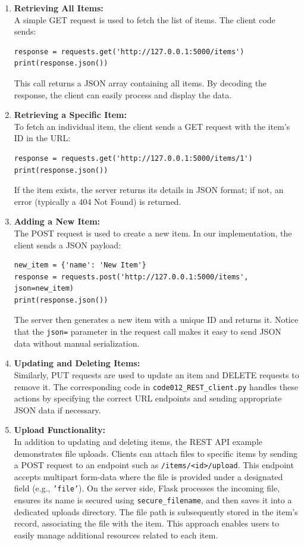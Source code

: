 \begin{enumerate}
  \item \textbf{Retrieving All Items:}\\  
  A simple GET request is used to fetch the list of items. The client code sends:
  \begin{verbatim}
response = requests.get('http://127.0.0.1:5000/items')
print(response.json())
  \end{verbatim}
  This call returns a JSON array containing all items. By decoding the response, the client can easily process and display the data.

  \item \textbf{Retrieving a Specific Item:}\\  
  To fetch an individual item, the client sends a GET request with the item’s ID in the URL:
  \begin{verbatim}
response = requests.get('http://127.0.0.1:5000/items/1')
print(response.json())
  \end{verbatim}
  If the item exists, the server returns its details in JSON format; if not, an error (typically a 404 Not Found) is returned.

  \item \textbf{Adding a New Item:}\\  
  The POST request is used to create a new item. In our implementation, the client sends a JSON payload:
  \begin{verbatim}
new_item = {'name': 'New Item'}
response = requests.post('http://127.0.0.1:5000/items', json=new_item)
print(response.json())
  \end{verbatim}
  The server then generates a new item with a unique ID and returns it. Notice that the \texttt{json=} parameter in the request call makes it easy to send JSON data without manual serialization.

  \item \textbf{Updating and Deleting Items:}\\  
  Similarly, PUT requests are used to update an item and DELETE requests to remove it. The corresponding code in \texttt{code012\_REST\_client.py} handles these actions by specifying the correct URL endpoints and sending appropriate JSON data if necessary.
	
	\item \textbf{Upload Functionality:}\\  
In addition to updating and deleting items, the REST API example demonstrates file uploads. Clients can attach files to specific items by sending a POST request to an endpoint such as \texttt{/items/\textless id\textgreater/upload}. This endpoint accepts multipart form-data where the file is provided under a designated field (e.g., \texttt{'file'}). On the server side, Flask processes the incoming file, ensures its name is secured using \texttt{secure\_filename}, and then saves it into a dedicated uploads directory. The file path is subsequently stored in the item's record, associating the file with the item. This approach enables users to easily manage additional resources related to each item.


\end{enumerate}
